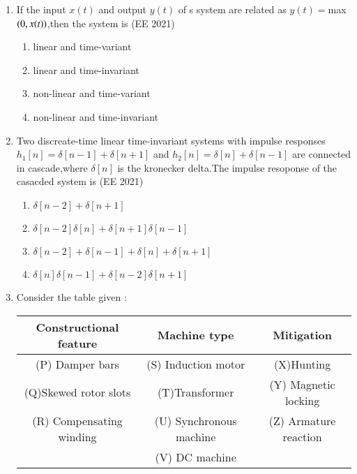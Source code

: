 \documentclass[journal,12pt,onecolumn]{IEEEtran}
\theoremstyle{remark}
\begin{document}
\begin{enumerate}
\item If the input $x(t)$ and output $y(t)$ of s system are related as $y(t)=$max$\left(0,x(t)\right)$,then the system is 
\hfill{(EE 2021)}

\begin{enumerate}
\item linear and time-variant
\item linear and time-invariant
\item non-linear and time-variant
\item non-linear and time-invariant
\end{enumerate}

\item Two discreate-time linear time-invariant systems with impulse responses $h_1[n]=\delta[n-1]+\delta[n+1]$ and $h_2[n]=\delta[n]+\delta[n-1]$ are connected in cascade,where $\delta[n]$ is the kronecker delta.The impulse resoponse of the casacded system is 
\hfill{(EE 2021)}
\begin{enumerate}
\item $\delta[n-2]+\delta[n+1]$
\item $\delta[n-2]\delta[n]+\delta[n+1]\delta[n-1]$
\item $\delta[n-2]+\delta[n-1]+\delta[n]+\delta[n+1]$
\item $\delta[n]\delta[n-1]+\delta[n-2]\delta[n+1]$
\end{enumerate}
\item Consider the table given :
\begin{table}[h!]    
  \centering
\begin{tabular}[12pt]{ |c| c| c|}
    \hline
    \textbf{Constructional feature} & \textbf{Machine type} & \textbf{Mitigation}  \\ 
    \hline
    (P) Damper bars & (S) Induction motor & (X)Hunting\\
    \hline
    (Q)Skewed rotor slots & (T)Transformer & (Y) Magnetic locking \\   
    \hline
    (R) Compensating winding & (U) Synchronous machine & (Z) Armature reaction \\
    \hline
      & (V) DC machine & \\
    \hline
    \end{tabular}
\end{table}



\end{enumerate}
\end{document}

